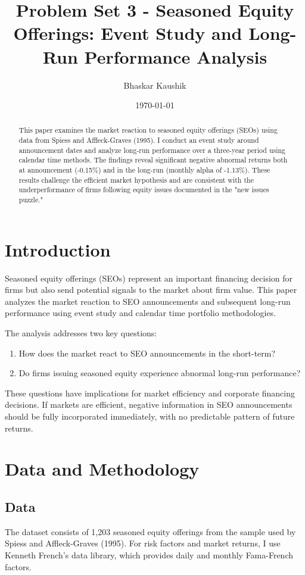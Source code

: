 \documentclass[12pt]{article}
\begin{document}
\title{Problem Set 3 - Seasoned Equity Offerings: Event Study and Long-Run Performance Analysis}
\author{Bhaskar Kaushik}
\date{\today}
\maketitle

\begin{abstract}
This paper examines the market reaction to seasoned equity offerings (SEOs) using data from Spiess and Affleck-Graves (1995). I conduct an event study around announcement dates and analyze long-run performance over a three-year period using calendar time methods. The findings reveal significant negative abnormal returns both at announcement (-0.15\%) and in the long-run (monthly alpha of -1.13\%). These results challenge the efficient market hypothesis and are consistent with the underperformance of firms following equity issues documented in the "new issues puzzle."
\end{abstract}

\section{Introduction}
Seasoned equity offerings (SEOs) represent an important financing decision for firms but also send potential signals to the market about firm value. This paper analyzes the market reaction to SEO announcements and subsequent long-run performance using event study and calendar time portfolio methodologies.

The analysis addresses two key questions:
\begin{enumerate}
    \item How does the market react to SEO announcements in the short-term?
    \item Do firms issuing seasoned equity experience abnormal long-run performance?
\end{enumerate}

These questions have implications for market efficiency and corporate financing decisions. If markets are efficient, negative information in SEO announcements should be fully incorporated immediately, with no predictable pattern of future returns.

\section{Data and Methodology}

\subsection{Data}
The dataset consists of 1,203 seasoned equity offerings from the sample used by Spiess and Affleck-Graves (1995). For risk factors and market returns, I use Kenneth French's data library, which provides daily and monthly Fama-French factors.
\end{document}
